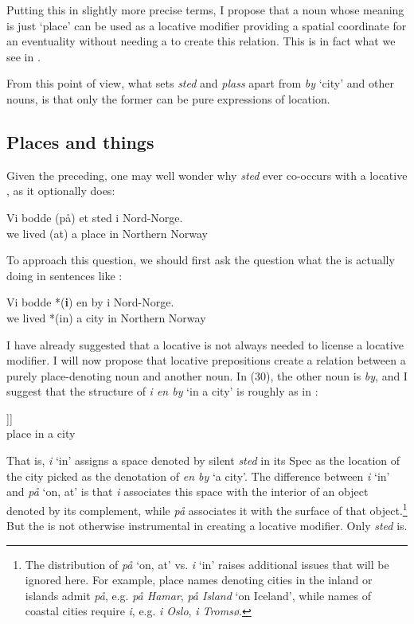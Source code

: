 \documentclass[output=paper]{LSP/langsci}
\begin{document}
Putting this in slightly more precise terms, I propose that a noun whose meaning is just `place' can be used as a locative modifier providing a spatial coordinate for an eventuality without needing a  to create this relation. This is in fact what we see in .

From this point of view, what sets \textit{sted} and \textit{plass} apart from \textit{by} `city' and other nouns, is that only the former can be pure expressions of location.

\subsection{Places and things}\label{sec:taraldsen:4.2}

Given the preceding, one may well wonder why \textit{sted} ever co-occurs with a locative , as it optionally does:

\ea%
    \label{ex:taraldsen:38}
    \gll Vi bodde (på) et sted i Nord-Norge.\\
         we lived  (at)  a place in {Northern Norway}\\
\z

To approach this question, we should first ask the question what the  is actually doing in sentences like :

\ea%
    \label{ex:taraldsen:39}
  \gll	  Vi bodde *(\textbf{i}) en by i Nord-Norge.\\
         we lived *(in) a city in {Northern Norway}\\
\z

I have already suggested that a locative  is not always needed to license a locative modifier. I will now propose that locative prepositions create a relation between a purely place-denoting noun and another noun. In (30), the other noun is \textit{by}, and I suggest that the structure of \textit{i en by} `in a city' is roughly as in :

\ea%
    \label{ex:taraldsen:40}
    \gll [ {STED} [ {i} [ en by ]]] \\
         {}  place {}   in {}  a city\\
\z

That is, \textit{i} `in' assigns a space denoted by silent \textit{sted} in its Spec as the location of the city picked as the denotation of \textit{en by} `a city'. The difference between \textit{i} `in' and \textit{på} `on, at' is that \textit{i} associates this space with the interior of an object denoted by its complement, while \textit{på} associates it with the surface of that object.\footnote{The distribution of  \textit{på} `on, at' vs. \textit{i} `in' raises additional issues that will be ignored here. For example, place names denoting cities in the inland  or islands admit \textit{på}, e.g. \textit{på Hamar}, \textit{på Island} `on Iceland', while names of coastal cities require \textit{i}, e.g. \textit{i Oslo}, \textit{i Tromsø}.}  But the  is not otherwise instrumental in creating a locative modifier. Only \textit{sted} is.
\end{document}
